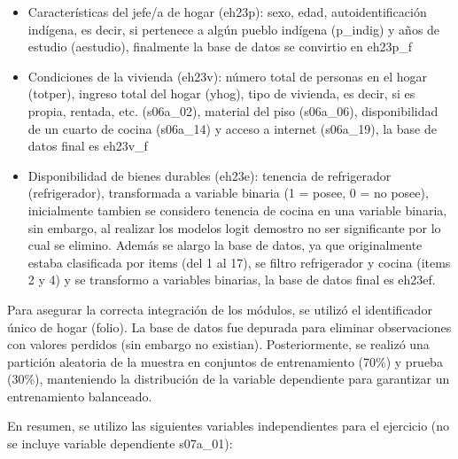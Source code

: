 \documentclass[Royal,times,sageh]{sagej}
\begin{document}
\begin{itemize}
\item
  Características del jefe/a de hogar (eh23p): sexo, edad,
  autoidentificación indígena, es decir, si pertenece a algún pueblo
  indígena (p\_indig) y años de estudio (aestudio), finalmente la base
  de datos se convirtio en eh23p\_f
\item
  Condiciones de la vivienda (eh23v): número total de personas en el
  hogar (totper), ingreso total del hogar (yhog), tipo de vivienda, es
  decir, si es propia, rentada, etc. (s06a\_02), material del piso
  (s06a\_06), disponibilidad de un cuarto de cocina (s06a\_14) y acceso
  a internet (s06a\_19), la base de datos final es eh23v\_f
\item
  Disponibilidad de bienes durables (eh23e): tenencia de refrigerador
  (refrigerador), transformada a variable binaria (1 = posee, 0 = no
  posee), inicialmente tambien se considero tenencia de cocina en una
  variable binaria, sin embargo, al realizar los modelos logit demostro
  no ser significante por lo cual se elimino. Además se alargo la base
  de datos, ya que originalmente estaba clasificada por items (del 1 al
  17), se filtro refrigerador y cocina (items 2 y 4) y se transformo a
  variables binarias, la base de datos final es eh23ef.
\end{itemize}

Para asegurar la correcta integración de los módulos, se utilizó el
identificador único de hogar (folio). La base de datos fue depurada para
eliminar observaciones con valores perdidos (sin embargo no existian).
Posteriormente, se realizó una partición aleatoria de la muestra en
conjuntos de entrenamiento (70\%) y prueba (30\%), manteniendo la
distribución de la variable dependiente para garantizar un entrenamiento
balanceado.

En resumen, se utilizo las siguientes variables independientes para el
ejercicio (no se incluye variable dependiente s07a\_01):
\end{document}
